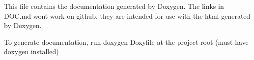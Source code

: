 This file contains the documentation generated by Doxygen. The links in DOC.\+md won\textquotesingle{}t work on github, they are intended for use with the html generated by Doxygen.

To generate documentation, run {\ttfamily doxygen Doxyfile} at the project root (must have doxygen installed) 